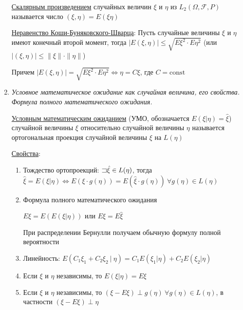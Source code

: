 \documentclass[12pt]{article}
\begin{document}
\begin{enumerate}
    \hyperlink{scalarproductoftwovariables}{Скалярным произведением} случайных величин $\xi$ и $\eta$ из $L_2(\Omega, \mathcal{F}, P)$ 
    называется число $(\xi, \eta) = E(\xi\eta)$

    \hyperlink{cauchybunyakovskyschwarzinequality}{Неравенство Коши-Буняковского-Шварца}: \Ths Пусть случайные величины $\xi$ и $\eta$ имеют конечный второй момент, тогда 
    $|E(\xi, \eta)| \leq \sqrt{E\xi^2 \cdot E\eta^2}$ (или $|(\xi, \eta)| \leq \|\xi\|\cdot\|\eta\|$)

    Причем $|E(\xi, \eta)| = \sqrt{E\xi^2 \cdot E\eta^2} \Longleftrightarrow \eta = C\xi$, где $C = \mathrm{const}$

    \item \textit{Условное математическое ожидание как случайная величина, его свойства. Формула полного математического ожидания.}

    \hyperlink{conditionalexpectedvalue}{Условным математическим ожиданием} (УМО, обозначается $E(\xi|\eta) = \hat{\xi}$) случайной величины $\xi$
    относительно случайной величины $\eta$ называется ортогональная проекция случайной величины $\xi$ на $L(\eta)$ 
    
    \hyperlink{conditionalexpectedvalueproperties}{Свойства}:

    \begin{enumerate}
        \item Тождество ортопроекций: $\mathord{\sqsupset} \hat{\xi} \in L(\eta)$, тогда $\hat{\xi} = E(\xi|\eta) \Longleftrightarrow E(\xi\cdot g(\eta)) = E(\hat{\xi}\cdot g(\eta)) \ \forall g(\eta) \in L(\eta)$

        \item Формула полного математического ожидания

        $E\xi = E(E(\xi|\eta))$ или $E\xi = E\hat{\xi}$

        \Nota При распределении Бернулли получаем обычную формулу полной вероятности

        \item Линейность: $E(C_1\xi_1 + C_2\xi_2 \ | \ \eta) = C_1 E(\xi_1|\eta) + C_2 E(\xi_2|\eta)$

        \item Если $\xi$ и $\eta$ независимы, то $E(\xi|\eta) = E\xi$

        \item Если $\xi$ и $\eta$ независимы, то $(\xi - E\xi) \perp g(\eta) \ \forall g(\eta) \in L(\eta)$, 
        в частности $(\xi - E\xi) \perp \eta$
    \end{enumerate}


\end{enumerate}
\end{document}
